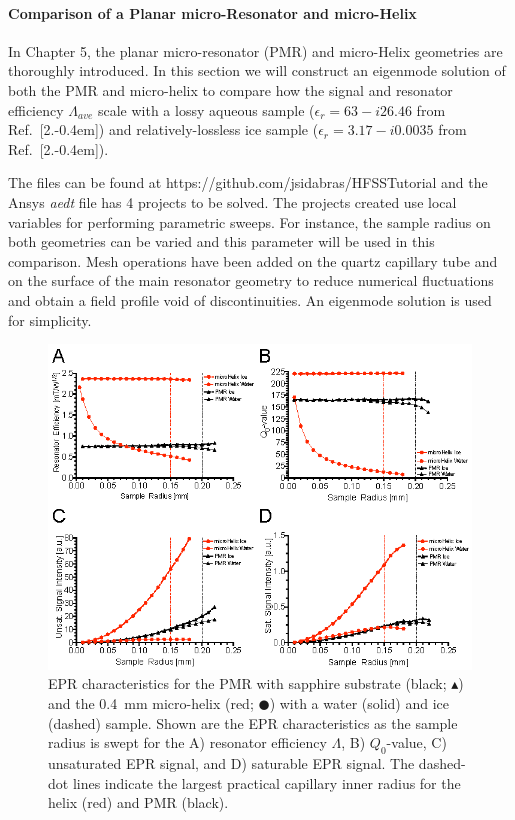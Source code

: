 \paragraph*{Comparison of a Planar micro-Resonator and micro-Helix}
In Chapter 5, the planar micro-resonator (PMR) \cite{Suter2005,Suter2008,suter2015} and micro-Helix geometries are thoroughly introduced. In this section we will construct an eigenmode solution of both the PMR and micro-helix to compare how the signal and resonator efficiency $\Lambda_{ave}$ scale with a lossy aqueous sample ($\epsilon_r = 63 - i26.46$ from Ref.~[2.\kern-0.4em]) and relatively-lossless ice sample ($\epsilon_r=3.17-i0.0035$ from Ref.~[2.\kern-0.4em]). 

The files can be found at https://github.com/jsidabras/HFSSTutorial and the Ansys \textit{aedt} file has 4 projects to be solved. The projects created use local variables for performing parametric sweeps. For instance, the sample radius on both geometries can be varied and this parameter will be used in this comparison. Mesh operations have been added on the quartz capillary tube and on the surface of the main resonator geometry to reduce numerical fluctuations and obtain a field profile void of discontinuities. An eigenmode solution is used for simplicity. 

\begin{figure}[ht]
 \centering
 \includegraphics[width=\textwidth]{Kapitel/Ch2-Images/Ch2-SweepOutput.eps}
 \caption[EPR characteristics as the sample radius is swept.]{EPR characteristics for the PMR with sapphire substrate (black; $\blacktriangle$) and the 0.4~mm micro-helix (red; $\CIRCLE$) with a water (solid) and ice (dashed) sample. Shown are the EPR characteristics as the sample radius is swept for the A) resonator efficiency $\Lambda$, B) $Q_0$-value, C) unsaturated EPR signal, and D) saturable EPR signal. The dashed-dot lines indicate the largest practical capillary inner radius for the helix (red) and PMR (black).}
 \label{fig:SweptData}
\end{figure}

